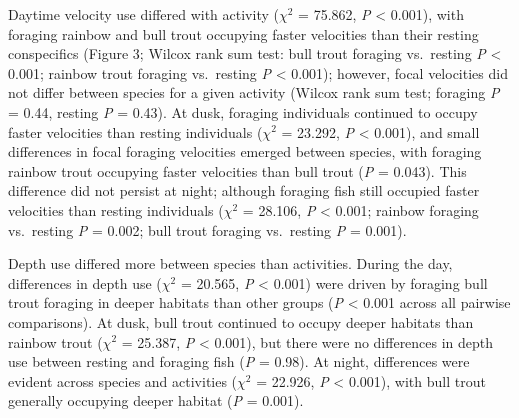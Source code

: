 \documentclass[]{article}
\begin{document}
Daytime velocity use differed with activity (\(\chi^2\) = 75.862,
\emph{P} \textless{} 0.001), with foraging rainbow and bull trout
occupying faster velocities than their resting conspecifics (Figure 3;
Wilcox rank sum test: bull trout foraging vs.~resting \emph{P}
\textless{} 0.001; rainbow trout foraging vs.~resting \emph{P}
\textless{} 0.001); however, focal velocities did not differ between
species for a given activity (Wilcox rank sum test; foraging \emph{P} =
0.44, resting \emph{P} = 0.43). At dusk, foraging individuals continued
to occupy faster velocities than resting individuals (\(\chi^2\) =
23.292, \emph{P} \textless{} 0.001), and small differences in focal
foraging velocities emerged between species, with foraging rainbow trout
occupying faster velocities than bull trout (\emph{P} = 0.043). This
difference did not persist at night; although foraging fish still
occupied faster velocities than resting individuals (\(\chi^2\) =
28.106, \emph{P} \textless{} 0.001; rainbow foraging vs.~resting
\emph{P} = 0.002; bull trout foraging vs.~resting \emph{P} = 0.001).

Depth use differed more between species than activities. During the day,
differences in depth use (\(\chi^2\) = 20.565, \emph{P} \textless{}
0.001) were driven by foraging bull trout foraging in deeper habitats
than other groups (\emph{P} \textless{} 0.001 across all pairwise
comparisons). At dusk, bull trout continued to occupy deeper habitats
than rainbow trout (\(\chi^2\) = 25.387, \emph{P} \textless{} 0.001),
but there were no differences in depth use between resting and foraging
fish (\emph{P} = 0.98). At night, differences were evident across
species and activities (\(\chi^2\) = 22.926, \emph{P} \textless{}
0.001), with bull trout generally occupying deeper habitat (\emph{P} =
0.001).
\end{document}
